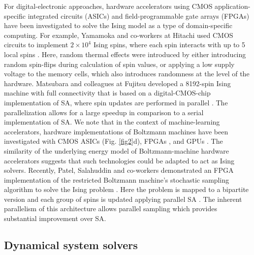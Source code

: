 \documentclass[fleqn,10pt]{wlscirep}
\def\change#1{#1}
\begin{document}
For digital-electronic approaches, hardware accelerators using CMOS application-specific integrated circuits \change{(ASICs)} \cite{yamaoka201520k,matsubara2020digital,aramon2019physics,su2020cimspin,yamamoto2020statica} and field-programmable gate arrays (FPGAs) \cite{tsukamoto2017accelerator,matsubara2017ising,yamamoto2017time,patel2020ising,aadit2021massively} have been investigated to solve the Ising model \change{as a type of domain-specific computing}. For example, Yamamoka and co-workers at Hitachi used CMOS circuits to implement $2 \times 10^{4}$ Ising spins, where each spin interacts with up to 5 local spins \cite{yamaoka201520k}.  Here, random thermal effects were introduced by either introducing random spin-flips during calculation of spin values, or applying a low supply voltage to the memory cells, which also introduces randomness at the level of the hardware. Matsubara and colleagues at Fujitsu developed a 8192-spin Ising machine with full connectivity that is based on a digital-CMOS-chip implementation of \change{SA}, where spin updates are performed in \change{parallel \cite{matsubara2020digital,tsukamoto2017accelerator,matsubara2017ising,aramon2019physics}.}  The parallelization allows for a large speedup in comparison to a serial implementation of \change{SA}. We note that in the context of machine-learning accelerators\cite{reuther2019survey}, hardware implementations of Boltzmann machines have been investigated with CMOS ASICs \cite{arima1991336,alspector1991relaxation,merolla2014million} (Fig. \ref{fig2}d), FPGAs \cite{skubiszewski1992extact,zhu2003fpga,kim2009highly,kim2010large,le2010high,kim2014fully}, and GPUs \cite{ly2008neural,zhu2013large}. 
The similarity of the underlying energy model of Boltzmann-machine hardware accelerators suggests that such technologies could be adapted to act as Ising solvers.  Recently, Patel, Salahuddin and co-workers demonstrated an FPGA implementation of the restricted Boltzmann machine's stochastic sampling algorithm to solve the Ising problem \cite{patel2020ising}. \change{Here the problem is mapped to a bipartite version and each group of spins is updated applying parallel SA \cite{PhysRevE.100.012111,yamamoto2020statica}}. The inherent parallelism of this architecture allows parallel sampling which provides substantial improvement over \change{SA}. 



\subsection*{Dynamical system solvers}
\end{document}
